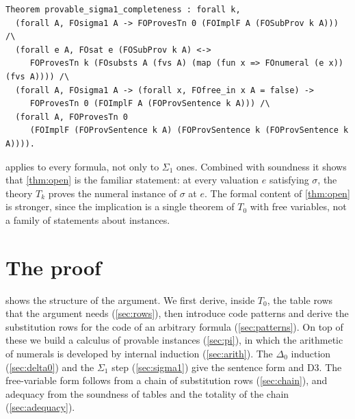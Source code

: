\documentclass[11pt]{article}
\theoremstyle{plain}
\theoremstyle{definition}
\theoremstyle{remark}
\newcommand{\T}[1]{T_{#1}}
\begin{document}
\begin{lstlisting}
Theorem provable_sigma1_completeness : forall k,
  (forall A, FOsigma1 A -> FOProvesTn 0 (FOImplF A (FOSubProv k A))) /\
  (forall e A, FOsat e (FOSubProv k A) <->
     FOProvesTn k (FOsubsts A (fvs A) (map (fun x => FOnumeral (e x)) (fvs A)))) /\
  (forall A, FOsigma1 A -> (forall x, FOfree_in x A = false) ->
     FOProvesTn 0 (FOImplF A (FOProvSentence k A))) /\
  (forall A, FOProvesTn 0
     (FOImplF (FOProvSentence k A) (FOProvSentence k (FOProvSentence k A)))).
\end{lstlisting}

\Cref{thm:meaning} applies to every formula, not only to $\Sigma_1$
ones.  Combined with soundness it shows that \cref{thm:open} is the
familiar statement: at every valuation $e$ satisfying $\sigma$, the
theory $\T{k}$ proves the numeral instance of $\sigma$ at $e$.  The
formal content of \cref{thm:open} is stronger, since the implication is
a single theorem of $\T0$ with free variables, not a family of
statements about instances.

\section{The proof}\label{sec:proof}

 shows the structure of the argument.  We first
derive, inside $\T0$, the table rows that the argument needs
(\cref{sec:rows}), then introduce code patterns and derive the
substitution rows for the code of an arbitrary formula
(\cref{sec:patterns}).  On top of these we build a calculus of provable
instances (\cref{sec:pi}), in which the arithmetic of numerals is
developed by internal induction (\cref{sec:arith}).  The $\Delta_0$
induction (\cref{sec:delta0}) and the $\Sigma_1$ step (\cref{sec:sigma1})
give the sentence form and D3.  The free-variable form follows from a
chain of substitution rows (\cref{sec:chain}), and adequacy from the
soundness of tables and the totality of the chain
(\cref{sec:adequacy}).
\end{document}
